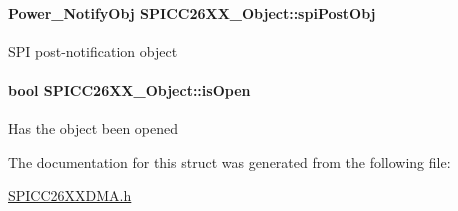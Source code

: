 \paragraph[{spi\-Post\-Obj}]{\setlength{\rightskip}{0pt plus 5cm}Power\-\_\-\-Notify\-Obj S\-P\-I\-C\-C26\-X\-X\-\_\-\-Object\-::spi\-Post\-Obj}\label{struct_s_p_i_c_c26_x_x___object_ad5d62652fb04c0cc1d27e20beaaa7d8f}
S\-P\-I post-\/notification object 
\paragraph[{is\-Open}]{\setlength{\rightskip}{0pt plus 5cm}bool S\-P\-I\-C\-C26\-X\-X\-\_\-\-Object\-::is\-Open}\label{struct_s_p_i_c_c26_x_x___object_aad3b6548b2adec791c856b725f3d768b}
Has the object been opened 

The documentation for this struct was generated from the following file\-:\begin{DoxyCompactItemize}
\item 
\hyperlink{_s_p_i_c_c26_x_x_d_m_a_8h}{S\-P\-I\-C\-C26\-X\-X\-D\-M\-A.\-h}\end{DoxyCompactItemize}
